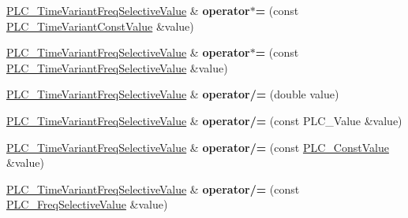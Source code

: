 \begin{DoxyCompactItemize}
\item 
\hypertarget{classns3_1_1PLC__TimeVariantFreqSelectiveValue_a2de3777ef2dde2e4364a6b5b08aa60bf}{\hyperlink{classns3_1_1PLC__TimeVariantFreqSelectiveValue}{\-P\-L\-C\-\_\-\-Time\-Variant\-Freq\-Selective\-Value} \& {\bfseries operator$\ast$=} (const \hyperlink{classns3_1_1PLC__TimeVariantConstValue}{\-P\-L\-C\-\_\-\-Time\-Variant\-Const\-Value} \&value)}\label{classns3_1_1PLC__TimeVariantFreqSelectiveValue_a2de3777ef2dde2e4364a6b5b08aa60bf}

\item 
\hypertarget{classns3_1_1PLC__TimeVariantFreqSelectiveValue_acc79bfd890172a1b1b18da1aa4ee51b0}{\hyperlink{classns3_1_1PLC__TimeVariantFreqSelectiveValue}{\-P\-L\-C\-\_\-\-Time\-Variant\-Freq\-Selective\-Value} \& {\bfseries operator$\ast$=} (const \hyperlink{classns3_1_1PLC__TimeVariantFreqSelectiveValue}{\-P\-L\-C\-\_\-\-Time\-Variant\-Freq\-Selective\-Value} \&value)}\label{classns3_1_1PLC__TimeVariantFreqSelectiveValue_acc79bfd890172a1b1b18da1aa4ee51b0}

\item 
\hypertarget{classns3_1_1PLC__TimeVariantFreqSelectiveValue_a4e0b01fec25be82eb6cb8f81138fb7fe}{\hyperlink{classns3_1_1PLC__TimeVariantFreqSelectiveValue}{\-P\-L\-C\-\_\-\-Time\-Variant\-Freq\-Selective\-Value} \& {\bfseries operator/=} (double value)}\label{classns3_1_1PLC__TimeVariantFreqSelectiveValue_a4e0b01fec25be82eb6cb8f81138fb7fe}

\item 
\hypertarget{classns3_1_1PLC__TimeVariantFreqSelectiveValue_a89b64ea70012b19e5bd49dc208d5d838}{\hyperlink{classns3_1_1PLC__TimeVariantFreqSelectiveValue}{\-P\-L\-C\-\_\-\-Time\-Variant\-Freq\-Selective\-Value} \& {\bfseries operator/=} (const \-P\-L\-C\-\_\-\-Value \&value)}\label{classns3_1_1PLC__TimeVariantFreqSelectiveValue_a89b64ea70012b19e5bd49dc208d5d838}

\item 
\hypertarget{classns3_1_1PLC__TimeVariantFreqSelectiveValue_ac1a9495b1779acf9f1707f28c00ccaff}{\hyperlink{classns3_1_1PLC__TimeVariantFreqSelectiveValue}{\-P\-L\-C\-\_\-\-Time\-Variant\-Freq\-Selective\-Value} \& {\bfseries operator/=} (const \hyperlink{classns3_1_1PLC__ConstValue}{\-P\-L\-C\-\_\-\-Const\-Value} \&value)}\label{classns3_1_1PLC__TimeVariantFreqSelectiveValue_ac1a9495b1779acf9f1707f28c00ccaff}

\item 
\hypertarget{classns3_1_1PLC__TimeVariantFreqSelectiveValue_a2961f78d2fc4d2e534f7c2649c851f31}{\hyperlink{classns3_1_1PLC__TimeVariantFreqSelectiveValue}{\-P\-L\-C\-\_\-\-Time\-Variant\-Freq\-Selective\-Value} \& {\bfseries operator/=} (const \hyperlink{classns3_1_1PLC__FreqSelectiveValue}{\-P\-L\-C\-\_\-\-Freq\-Selective\-Value} \&value)}\label{classns3_1_1PLC__TimeVariantFreqSelectiveValue_a2961f78d2fc4d2e534f7c2649c851f31}


\end{DoxyCompactItemize}
